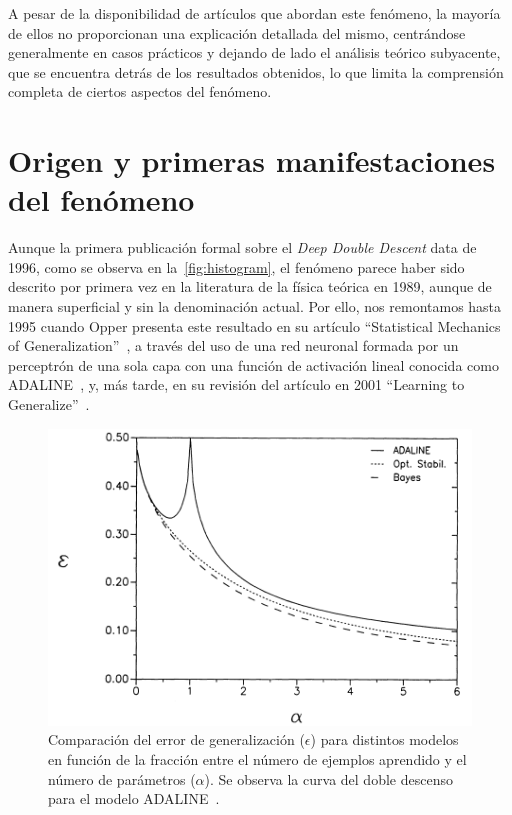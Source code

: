 A pesar de la disponibilidad de artículos que abordan este fenómeno, la mayoría de ellos no proporcionan una explicación detallada del mismo, centrándose generalmente en casos prácticos y dejando de lado el análisis teórico subyacente, que se encuentra detrás de los resultados obtenidos, lo que limita la comprensión completa de ciertos aspectos del fenómeno.\newline

\section{Origen y primeras manifestaciones del fenómeno}\label{}

Aunque la primera publicación formal sobre el \emph{Deep Double Descent} data de 1996, como se observa en la~\autoref{fig:histogram}, el fenómeno parece haber sido descrito por primera vez en la literatura de la física teórica en 1989, aunque de manera superficial y sin la denominación actual. Por ello, nos remontamos hasta 1995 cuando Opper presenta este resultado en su artículo ``Statistical Mechanics of Generalization''~\cite{Opper1995}, a través del uso de una red neuronal formada por un perceptrón de una sola capa con una función de activación lineal conocida como ADALINE~\cite{WidrowHoff1960}, y, más tarde, en su revisión del artículo en 2001 ``Learning to Generalize''~\cite{Opper2001}.\newline

\begin{figure}[h]
    \centering
    \includegraphics[width=0.8\linewidth]{img/estadoarte2.png}
    \caption[Deep Double Descent presente en ADALINE.]{Comparación del error de generalización ($\epsilon$) para distintos modelos en función de la fracción entre el número de ejemplos aprendido y el número de parámetros ($\alpha$). Se observa la curva del doble descenso para el modelo ADALINE~\cite{Opper1995}.}\label{fig:estadoarte2}
\end{figure}

